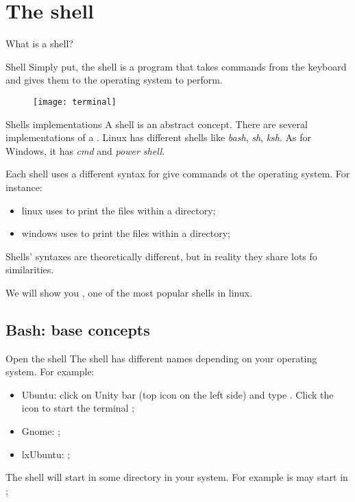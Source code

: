 \section{The shell}

\begin{frame}{What is a shell?}

\begin{block}{Shell}
Simply put, the shell is a program that takes commands from the keyboard and gives them to the operating system to perform\cite{whatIsTheShell}.
\end{block}

\begin{figure}
	\centering
	\texttt{[image: terminal]}
\end{figure}

\end{frame}

\begin{frame}{Shells implementations}
	A shell is an abstract concept. There are several implementations of a . Linux has different shells like \textit{bash}, \textit{sh}, \textit{ksh}. As for Windows, it has \textit{cmd} and \textit{power shell}.
	
	Each shell uses a different syntax for give commands ot the operating system. For instance:
	\begin{itemize}
		\item linux uses  to print the files within a directory;
		\item windows uses  to print the files within a directory;
	\end{itemize}
	
	Shells' syntaxes are theoretically different, but in reality they share lots fo similarities.
	
	\begin{note}
		We will show you , one of the most popular shells in linux.
	\end{note}
\end{frame}

\subsection{Bash: base concepts}

\begin{frame}{Open the shell}
	The shell has different names depending on your operating system. For example:
	\begin{itemize}
		\item Ubuntu: click on Unity bar (top icon on the left side) and type . Click the icon to start the terminal \cite{ubuntu:openterminal};
		\item Gnome: ;
		\item lxUbuntu: ;
	\end{itemize}
	
	The shell will start in some directory in your system. For example is may start in ;
\end{frame}


